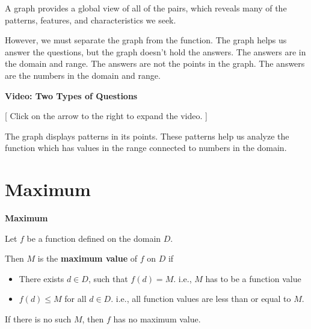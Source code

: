 \documentclass{ximera}
\begin{document}
A graph provides a global view of all of the pairs, which reveals many of the patterns, features, and characteristics we seek.   

However, we must separate the graph from the function.  The graph helps us answer the questions, but the graph doesn't hold the answers.  The answers are in the domain and range.  The answers are not the points in the graph.  The answers are the numbers in the domain and range.






\begin{explanation} \textbf{Video: Two Types of Questions}

[ Click on the arrow to the right to expand the video. ]
\begin{expandable} 

\begin{center}
\end{center}

\end{expandable}
\end{explanation}








The graph displays patterns in its points.  These patterns help us analyze the function which has values in the range connected to numbers in the domain.




\section{Maximum}



\begin{definition} \textbf{\textcolor{green!50!black}{Maximum}} 


Let $f$ be a function defined on the domain $D$.

Then $M$ is the \textbf{maximum value} of $f$ on $D$ if    


\begin{itemize}
\item There exists $d \in D$, such that $f(d) = M$.   i.e., $M$ has to be a function value \\

\item $f(d) \leq M$ for all $d \in D$. i.e., all function values are less than or equal to $M$. 

\end{itemize}


If there is no such $M$, then $f$ has no maximum value.

\end{definition}
\end{document}

